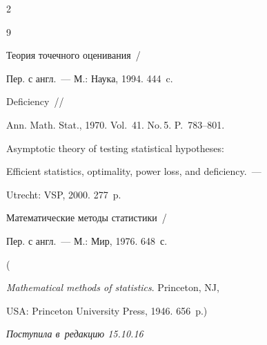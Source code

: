 \begin{multicols}{2}
{{\begin{thebibliography}{9}


 Теория точечного оценивания~/


Пер. с англ.~--- М.: Наука, 1994. 444~c.










 Deficiency~//


Ann. Math. Stat., 1970. Vol.~41. No.\,5. P.~783--801.







 Asymptotic theory of testing statistical hypotheses: 


Efficient statistics, optimality, power loss, and deficiency.~--- 


Utrecht: VSP, 2000. 277~p.







 Математические методы статистики~/


Пер. с англ.~--- М.: Мир, 1976. 648~с.


(  


\textit{Mathematical methods of statistics}. Princeton, NJ,


USA: Princeton University Press, 1946. 656~p.)


 \end{thebibliography}





 }


 }





\end{multicols}





\vspace*{-3pt}





\hfill{\small\textit{Поступила в~редакцию 15.10.16}}





\vspace*{8pt}





